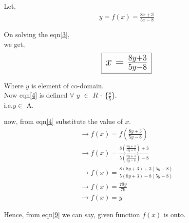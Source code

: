 \documentclass[journal,12pt,twocolumn]{IEEEtran}
\begin{document}
\vspace{5mm}
\vspace{5mm}

\noindent Let,
\begin{align} \label{3}
y = f(x) = \frac{8x+3}{5x-8}
\end{align}

On solving the eqn\eqref{3},\\ we get,
\begin{align} \label{4}
\LARGE\framebox[1.2\width]{$x$ = $\frac{8y+3}{5y-8}$}
\end{align}

Where $y$ is element of co-domain.\\ Now eqn\eqref{4} is defined $\forall$ $y$ $\in$ $R$ - \{$\frac{8}{5}$\}.\\ i.e.$y \in$ A.
\vspace{5mm}

\noindent now, from eqn\eqref{4} substitute the value of $x$.
\begin{align}
\rightarrow f(x) = f(\frac{8y+3}{5y-8}) \\
\rightarrow f(x) = \frac{8(\frac{8y+3}{5y-8})+3}{5(\frac{8y+3}{5y-8})-8} \\
\rightarrow f(x) = \frac{8(8y+3)+3(5y-8)}{5(8y+3)-8(5y-8)}\\
\rightarrow f(x)=\frac{79y}{79} \\
\rightarrow f(x) = y \label{9}
\end{align}

\noindent Hence, from eqn\eqref{9} we can say, given function $f(x)$ is onto.
\vspace{5mm}

\vspace{5mm}
\end{document}
